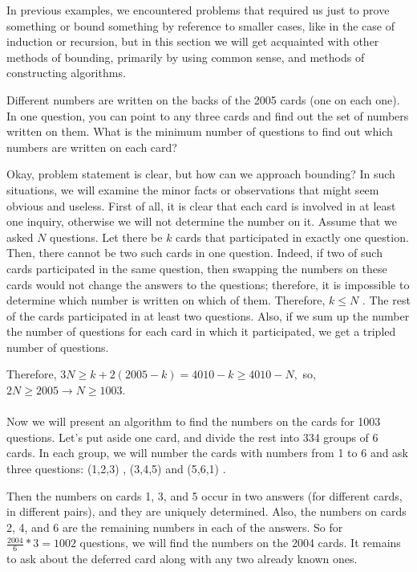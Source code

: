 In previous examples, we encountered problems that required us just to prove something or bound something by reference to smaller cases, like in the case of induction or recursion, but in this section we will get acquainted with other methods of bounding, primarily by using common sense, and methods of constructing algorithms.  

\begin{example} [Russia 2005]
    Different numbers are written on the backs of the 2005 cards (one on each one). In one question, you can point to any three cards and find out the set of numbers written on them. What is the minimum number of questions to find out which numbers are written on each card?
\end{example}

\sol Okay, problem statement is clear, but how can we approach bounding? In such situations, we will examine the minor facts or observations that might seem obvious and useless. First of all, it is clear that each card is involved in at least one inquiry, otherwise we will not determine the number on it. Assume that we asked $N$ questions. Let there be $k$ cards that participated in exactly one question. Then, there cannot be two such cards in one question. Indeed, if two of such cards participated in the same question, then swapping the numbers on these cards would not change the answers to the questions; therefore, it is impossible to determine which number is written on which of them. Therefore, $k\leq N$ . The rest of the cards participated in at least two questions. Also, if we sum up the number the number of questions for each card in which it participated, we get a tripled number of questions.

Therefore, $3N \geq k + 2(2005-k) = 4010-k \geq 4010-N ,$ so, $2N \geq 2005 \rightarrow  N\geq 1003$. 
\\\\
Now we will present an algorithm to find the numbers on the cards for 1003 questions. Let's put aside one card, and divide the rest into 334 groups of 6 cards. In each group, we will number the cards with numbers from 1 to 6 and ask three questions: (1,2,3) , (3,4,5) and (5,6,1) .

Then the numbers on cards 1, 3, and 5 occur in two answers (for different cards, in different pairs), and they are uniquely determined. Also, the numbers on cards 2, 4, and 6 are the remaining numbers in each of the answers. So for $\frac{2004}{6} * 3 = 1002$ questions, we will find the numbers on the 2004 cards.
It remains to ask about the deferred card along with any two already known ones.

